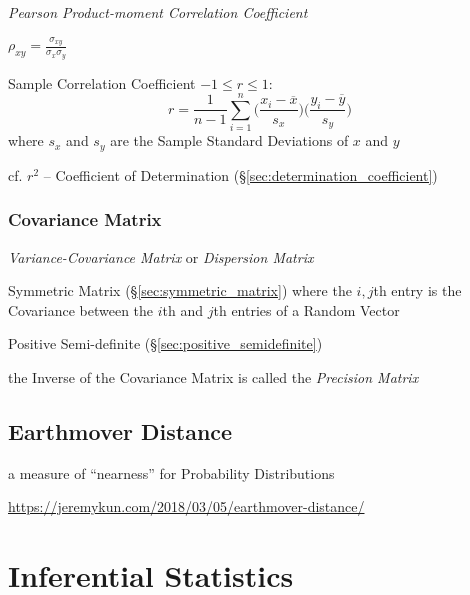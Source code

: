 \emph{Pearson Product-moment Correlation Coefficient}

$\rho_{xy} = \frac{\sigma_{xy}}{\sigma_x \sigma_y}$

Sample Correlation Coefficient $-1 \leq r \leq 1$:
\[
  r = \frac{1}{n-1} \sum_{i=1}^n
    \Big(\frac{x_i - \overline{x}}{s_x}\Big)
    \Big(\frac{y_i - \overline{y}}{s_y}\Big)
\]
where $s_x$ and $s_y$ are the Sample Standard Deviations of $x$ and $y$

\fist cf. $r^2$ -- Coefficient of
Determination (\S\ref{sec:determination_coefficient})



\subsubsection{Covariance Matrix}\label{sec:covariance_matrix}

\emph{Variance-Covariance Matrix} or \emph{Dispersion Matrix}

Symmetric Matrix (\S\ref{sec:symmetric_matrix}) where the $i,j$th entry is the
Covariance between the $i$th and $j$th entries of a Random Vector

Positive Semi-definite (\S\ref{sec:positive_semidefinite})

the Inverse of the Covariance Matrix is called the \emph{Precision Matrix}



\subsection{Earthmover Distance}\label{sec:earthmover_distance}


a measure of ``nearness'' for Probability Distributions

\url{https://jeremykun.com/2018/03/05/earthmover-distance/}



\section{Inferential Statistics}\label{sec:inferential_statistics}

